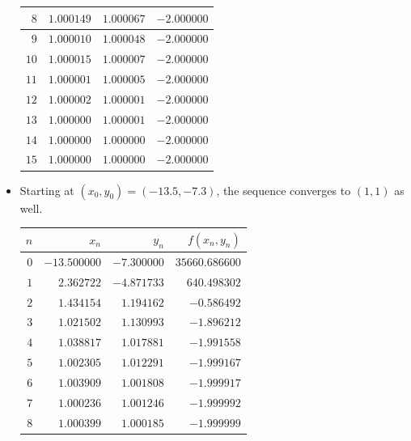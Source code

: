 \begin{example}
\begin{itemize}
\begin{center}
\begin{tabular}{|r|r|r|r|}
	$8$ & $1.000149$ & $1.000067$ & $-2.000000$ \\ \hline 
	$9$ & $1.000010$ & $1.000048$ & $-2.000000$ \\ \hline 
	$10$ & $1.000015$ & $1.000007$ & $-2.000000$ \\ \hline 
	$11$ & $1.000001$ & $1.000005$ & $-2.000000$ \\ \hline 
	$12$ & $1.000002$ & $1.000001$ & $-2.000000$ \\ \hline 
	$13$ & $1.000000$ & $1.000001$ & $-2.000000$ \\ \hline 
	$14$ & $1.000000$ & $1.000000$ & $-2.000000$ \\ \hline 
	$15$ & $1.000000$ & $1.000000$ & $-2.000000$ \\ \hline 
	\end{tabular}
	\end{center}
	\item Starting at $(x_0, y_0) = (-13.5, -7.3)$, the sequence converges to $(1,1)$ as well.
	\begin{center}
	\begin{tabular}{|r|r|r|r|} \hline 
	$n$ & $x_n$ & $y_n$ & $f(x_n,y_n)$ \\ \hline \hline 
	$0$ & $-13.500000$ & $-7.300000$ & $35660.686600$ \\ \hline 
	$1$ & $2.362722$ & $-4.871733$ & $640.498302$ \\ \hline 
	$2$ & $1.434154$ & $1.194162$ & $-0.586492$ \\ \hline 
	$3$ & $1.021502$ & $1.130993$ & $-1.896212$ \\ \hline 
	$4$ & $1.038817$ & $1.017881$ & $-1.991558$ \\ \hline 
	$5$ & $1.002305$ & $1.012291$ & $-1.999167$ \\ \hline 
	$6$ & $1.003909$ & $1.001808$ & $-1.999917$ \\ \hline 
	$7$ & $1.000236$ & $1.001246$ & $-1.999992$ \\ \hline 
	$8$ & $1.000399$ & $1.000185$ & $-1.999999$ \\ \hline 

\end{tabular}
\end{center}
\end{itemize}
\end{example}
